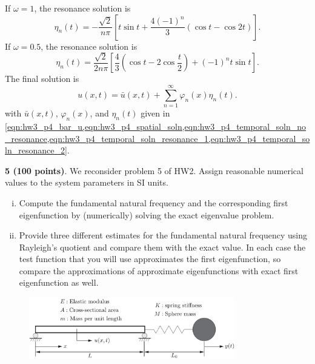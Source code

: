 If $\omega = 1$, the resonance solution is 
\begin{equation}\label{eqn:hw3_p4_temporal_soln_resonance_1}
    \eta_n(t) = -\frac{\sqrt{2}}{n\pi}\left[t\sin t + \frac{4{(-1)}^n}{3}(\cos t - \cos 2 t) \right].
\end{equation}
If $\omega = 0.5$, the resonance solution is 
\begin{equation}\label{eqn:hw3_p4_temporal_soln_resonance_2}
    \eta_n(t) = \frac{\sqrt{2}}{2n\pi}\left[\frac{4}{3}\left(\cos t - 2\cos \frac{t}{2}\right) + {(-1)}^n t\sin t \right].
\end{equation}
The final solution is 
\begin{equation}
    u(x, t) = \bar{u}(x, t) + \sum_{n=1}^\infty \varphi_n(x) \eta_n(t).
\end{equation}
with $\bar{u}(x, t)$, $\varphi_n(x)$, and $\eta_n(t)$ given in \cref{eqn:hw3_p4_bar_u,eqn:hw3_p4_spatial_soln,eqn:hw3_p4_temporal_soln_no_resonance,eqn:hw3_p4_temporal_soln_resonance_1,eqn:hw3_p4_temporal_soln_resonance_2}. 

\begin{problem}
    \textbf{5 (100 points)}. We reconsider problem 5 of HW2. Assign reasonable numerical values to the system parameters in SI units.
    \begin{enumerate}[(i)]
        \item {
            Compute the fundamental natural frequency and the corresponding first eigenfunction by (numerically) solving the exact eigenvalue problem.
        } 
        \item {
            Provide three different estimates for the fundamental natural frequency using Rayleigh's quotient and compare them with the exact value. 
            In each case the test function that you will use approximates the first eigenfunction, so compare the approximations of approximate eigenfunctions with exact first eigenfunction as well.
        }
    \end{enumerate}
\end{problem}
\begin{figure}[!ht]
    \centering
    \includegraphics[width=0.8\textwidth]{homework/hw3/assets/hw3_p5.pdf}
\end{figure}

